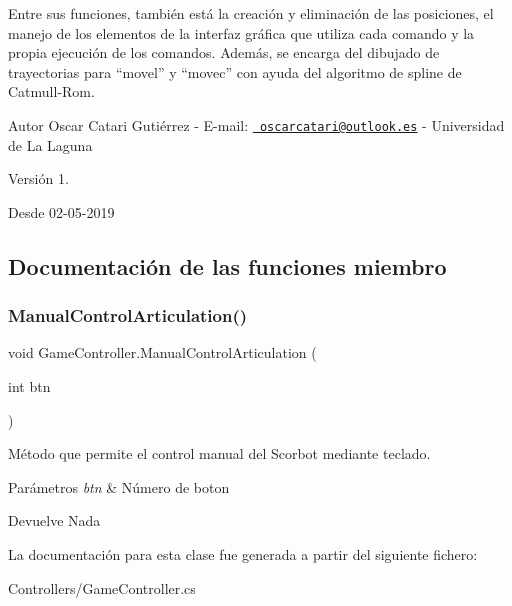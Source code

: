 Entre sus funciones, también está la creación y eliminación de las posiciones, el manejo de los elementos de la interfaz gráfica que utiliza cada comando y la propia ejecución de los comandos. Además, se encarga del dibujado de trayectorias para “movel” y “movec” con ayuda del algoritmo de spline de Catmull-\/\+Rom. \begin{DoxyAuthor}{Autor}
Oscar Catari Gutiérrez -\/ E-\/mail\+: \href{mailto:oscarcatari@outlook.es}{\texttt{ oscarcatari@outlook.\+es}} -\/ Universidad de La Laguna 
\end{DoxyAuthor}
\begin{DoxyVersion}{Versión}
1. 
\end{DoxyVersion}
\begin{DoxySince}{Desde}
02-\/05-\/2019 
\end{DoxySince}


\subsection{Documentación de las funciones miembro}
\mbox{\label{class_game_controller_af2f693d76f1b9bf4ff0403802ad44cae}} 
\subsubsection{\texorpdfstring{ManualControlArticulation()}{ManualControlArticulation()}}
{\footnotesize\ttfamily void Game\+Controller.\+Manual\+Control\+Articulation (\begin{DoxyParamCaption}\item[{int}]{btn }\end{DoxyParamCaption})\hspace{0.3cm}{\ttfamily [inline]}}

Método que permite el control manual del Scorbot mediante teclado. 
\begin{DoxyParams}{Parámetros}
{\em btn} & Número de boton \\
\hline
\end{DoxyParams}
\begin{DoxyReturn}{Devuelve}
Nada 
\end{DoxyReturn}


La documentación para esta clase fue generada a partir del siguiente fichero\+:\begin{DoxyCompactItemize}
\item 
Controllers/Game\+Controller.\+cs\end{DoxyCompactItemize}
